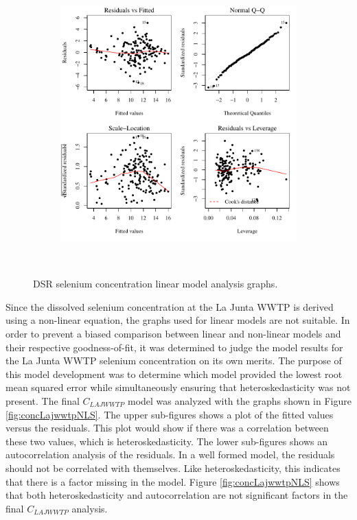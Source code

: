 \begin{linenumbers}
\subfiguremid
\begin{landscape}
	\begin{figure}
		\begin{subfigure}{0.7\textwidth}
			\centering
			\includegraphics[width=\tableCustomSize]{"Figures/Results_DSR/Stochastic/Conc Model lm-fit DDIV"}
		\end{subfigure}\\
		\caption{DSR selenium concentration linear model analysis graphs.}
	\end{figure}
\end{landscape}
\subfiguretop

Since the dissolved selenium concentration at the La Junta WWTP is derived using a non-linear equation, the graphs used for linear models are not suitable.  In order to prevent a biased comparison between linear and non-linear models and their respective goodness-of-fit, it was determined to judge the model results for the La Junta WWTP selenium concentration on its own merits.  The purpose of this model development was to determine which model provided the lowest root mean squared error while simultaneously ensuring that heteroskedasticity was not present.  The final $ C_{LAJWWTP} $ model was analyzed with the graphs shown in Figure \ref{fig:concLajwwtpNLS}.  The upper sub-figures shows a plot of the fitted values versus the residuals.  This plot would show if there was a correlation between these two values, which is heteroskedasticity.  The lower sub-figures shows an autocorrelation analysis of the residuals.  In a well formed model, the residuals should not be correlated with themselves.  Like heteroskedasticity, this indicates that there is a factor missing in the model.  Figure \ref{fig:concLajwwtpNLS} shows that both heteroskedasticity and autocorrelation are not significant factors in the final $ C_{LAJWWTP} $ analysis.


\end{linenumbers}
